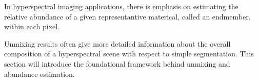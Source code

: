 In hyperspectral imaging applications, there is emphasis on estimating the relative abundance of a given representantive materical, called an endmember, within each pixel. 

Unmixing results often give more detailed information about the overall composition of a hyperspectral scene with respect to simple segmentation. This section will introduce the foundational framework behind unmixing and abundance estimation.